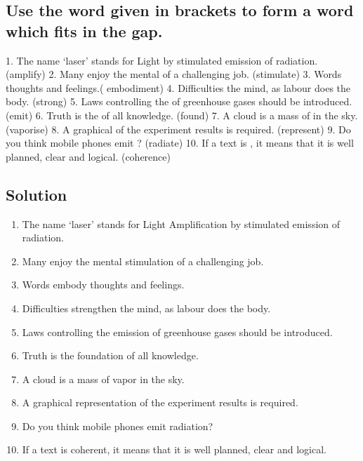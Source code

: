 \subsection*{Use the word given in brackets to form a word which fits in the gap.}
1. The name ‘laser’ stands for Light \underline{\hspace{2cm}} by stimulated emission of radiation.
(amplify) 2. Many enjoy the mental \underline{\hspace{2cm}} of a challenging job. (stimulate) 3.
Words \underline{\hspace{2cm}} thoughts and feelings.( embodiment) 4. Difficulties \underline{\hspace{2cm}} the
mind, as labour does the body. (strong) 5. Laws controlling the \underline{\hspace{2cm}} of greenhouse
gases should be introduced. (emit) 6. Truth is the \underline{\hspace{2cm}} of all knowledge. (found)
7. A cloud is a mass of \underline{\hspace{2cm}} in the sky. (vaporise) 8. A graphical \underline{\hspace{2cm}}
of the experiment results is required. (represent) 9. Do you think mobile phones
emit \underline{\hspace{2cm}} ? (radiate) 10. If a text is \underline{\hspace{2cm}}, it means that it is well
planned, clear and logical. (coherence)

\subsection*{Solution}
\begin{enumerate}
      \item The name ‘laser’ stands for Light Amplification by stimulated emission of
            radiation.
      \item Many enjoy the mental stimulation of a challenging job.
      \item Words embody thoughts and feelings.
      \item Difficulties strengthen the mind, as labour does the body.
      \item Laws controlling the emission of greenhouse gases should be introduced.
      \item Truth is the foundation of all knowledge.
      \item A cloud is a mass of vapor in the sky.
      \item A graphical representation of the experiment results is required.
      \item Do you think mobile phones emit radiation?
      \item If a text is coherent, it means that it is well planned, clear and logical.
\end{enumerate}

